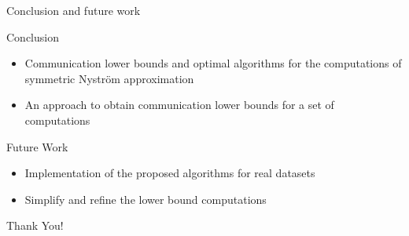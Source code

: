 \documentclass[aspectratio=169]{beamer}
\begin{document}
\begin{frame}{Conclusion and future work}
	\begin{block}{Conclusion}
		\begin{itemize}
			\item Communication lower bounds and optimal algorithms for the computations of symmetric Nyström approximation
			\item An approach to obtain communication lower bounds for a set of computations
		\end{itemize}
	\end{block}
	\vfill
	\begin{block}{Future Work}
		\begin{itemize}
			\item Implementation of the proposed algorithms for real datasets
			\item Simplify and refine the lower bound computations
		\end{itemize}
	\end{block}
	\vfill
		\Huge{\centerline{Thank You!}}
\end{frame}

%
\end{document}
